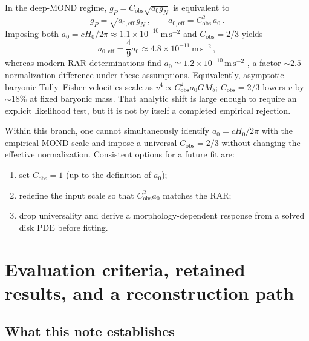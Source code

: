 \documentclass[aps,prd,reprint,superscriptaddress,nofootinbib,floatfix,showkeys]{revtex4-2}
\newcommand{\Cobs}{C_{\mathrm{obs}}}
\newcommand{\azero}{a_{0}}
\newcommand{\Hzero}{H_{0}}
\begin{document}
In the deep-MOND regime, \(g_{P}=\Cobs\sqrt{\azero g_{N}}\) is equivalent to
\begin{equation}
  g_{P}=\sqrt{a_{0,\mathrm{eff}}\,g_{N}}\,,
  \qquad
  a_{0,\mathrm{eff}} = \Cobs^{2}\,\azero\,.
  \label{eq:a0eff}
\end{equation}
Imposing both \(\azero=c\Hzero/2\pi\approx 1.1\times 10^{-10}\,\mathrm{m\,s^{-2}}\)
and \(\Cobs=2/3\) yields
\begin{equation}
  a_{0,\mathrm{eff}} = \frac{4}{9}\azero
  \approx 4.8\times 10^{-11}\,\mathrm{m\,s^{-2}}\,,
  \label{eq:a0eff-num}
\end{equation}
whereas modern RAR determinations find
\(a_0\simeq 1.2\times 10^{-10}\,\mathrm{m\,s^{-2}}\)
\cite{mcgaugh_rar,lelli_rar}, a factor \(\sim 2.5\) normalization difference
under these assumptions.
Equivalently, asymptotic baryonic Tully--Fisher velocities scale as
\(v^{4}\propto \Cobs^{2}\azero GM_{b}\); \(\Cobs=2/3\) lowers \(v\) by
\(\sim 18\%\) at fixed baryonic mass.  That analytic shift is large enough to
require an explicit likelihood test, but it is not by itself a completed
empirical rejection.

Within this branch, one cannot simultaneously identify
\(\azero=c\Hzero/2\pi\) with the empirical MOND scale and impose a universal
\(\Cobs=2/3\) without changing the effective normalization.  Consistent
options for a future fit are:
\begin{enumerate}
\item set \(\Cobs=1\) (up to the definition of \(\azero\));
\item redefine the input scale so that \(\Cobs^{2}\azero\) matches the RAR;
\item drop universality and derive a morphology-dependent response from a
  solved disk PDE before fitting.
\end{enumerate}

\section{Evaluation criteria, retained results, and a reconstruction path}
\label{sec:path}

\subsection{What this note establishes}
\end{document}
